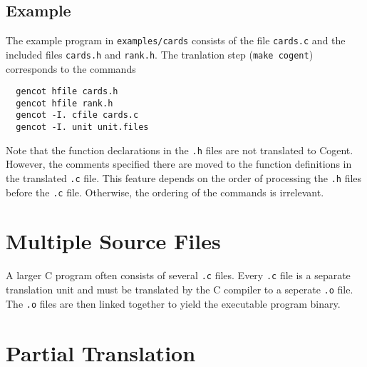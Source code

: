 \documentclass[a4paper]{report}
\newcommand{\code}[1]{\textnormal{\texttt{#1}}}
\begin{document}
\subsection{Example}

The example program in \code{examples/cards} consists of the file \code{cards.c} and the included files \code{cards.h}
and \code{rank.h}. The tranlation step (\code{make cogent}) corresponds to the commands
\begin{verbatim}
  gencot hfile cards.h
  gencot hfile rank.h
  gencot -I. cfile cards.c
  gencot -I. unit unit.files
\end{verbatim}

Note that the function declarations in the \code{.h} files are not translated to Cogent. However, the comments specified 
there are moved to the function definitions in the translated \code{.c} file. This feature depends on the order of
processing the \code{.h} files before the \code{.c} file. Otherwise, the ordering of the commands is irrelevant.

\section{Multiple Source Files}
\label{simple-multi}

A larger C program often consists of several \code{.c} files. Every \code{.c} file is a separate translation unit and
must be translated by the C compiler to a seperate \code{.o} file. The \code{.o} files are then linked together to
yield the executable program binary.



\section{Partial Translation}
\label{simple-partial}
\end{document}
